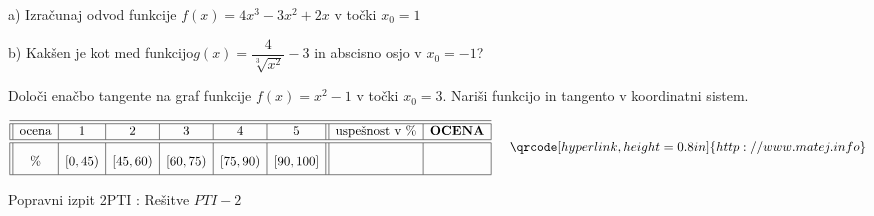\documentclass[a4paper,12pt]{letter}
\newcounter{tocke}
\begin{document}
\newpage

\def\tockeG{5+5}
\begin{naloga}[\hfill $\tockeG$
\qquad \rightsquigarrow \vert a.\qquad|b.\qquad|] \addtocounter{tocke}{\tockeG}
a) Izračunaj odvod funkcije $f(x)=4x^3-3x^2+2x$ v točki $x_0=1$

b) Kakšen je kot med funkcijo$g(x)=\dfrac{4}{\sqrt[3]{x^2}}-3$  in abscisno osjo  v $x_0=-1$?
\end{naloga}

\newpage

\def\tockeH{6+4}
\begin{naloga}[\hfill $\tockeH$
\qquad \rightsquigarrow \vert a.\qquad|b.\qquad|] \addtocounter{tocke}{\tockeH}
Določi enačbo tangente na graf funkcije $f(x)=x^2-1$ v točki $x_0=3$. Nariši funkcijo in tangento v koordinatni sistem.
\end{naloga}

\vfill
{}
\begin{kriterij*}
$$
\begin{array}{||c|c|c|c|c|c||>{}c|c|}
\hline\hline
\textup{ocena}& 1&2&3&4&5&\textrm{uspe\v{s}nost v } \%& \textrm{\bf OCENA}\\
\hline\hline
\% & [0,45) &[45,60)&[60,75) &[75,90) & [90,100]&
\mbox{\phantom{\huge{$\frac{5}{445}$15}}} & \\
\hline
\end{array}
\hspace*{0.5cm}\vspace*{-0.3cm}
\qrcode[hyperlink,height=0.8in]{http://www.matej.info}
$$
\vspace*{0.1cm}
\end{kriterij*}
\newpage



\begin{minipage}{20cm}
\begin{bclogo}[couleur=brown!40,
  arrondi=0,ombre=true, couleurOmbre=gray!50,
  logo=\bcplume, noborder=true]
{\textrm{{\Large{Popravni izpit 2PTI} \Huge{}:
\large{Re\v{s}itve} \hfill $PTI-2$}}}
\end{bclogo}
\end{minipage}

\vspace{0.5cm}
\end{document}
